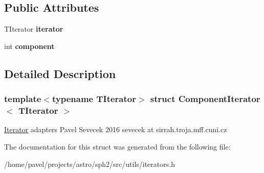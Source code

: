 \subsection*{Public Attributes}
\begin{DoxyCompactItemize}
\item 
\hypertarget{structComponentIterator_a9848900414c31afb41fd3426097cf24e}{}\label{structComponentIterator_a9848900414c31afb41fd3426097cf24e} 
T\+Iterator {\bfseries iterator}
\item 
\hypertarget{structComponentIterator_a7e530e5fea4c2dbd14287ee5efb78197}{}\label{structComponentIterator_a7e530e5fea4c2dbd14287ee5efb78197} 
int {\bfseries component}
\end{DoxyCompactItemize}


\subsection{Detailed Description}
\subsubsection*{template$<$typename T\+Iterator$>$\newline
struct Component\+Iterator$<$ T\+Iterator $>$}

\hyperlink{classIterator}{Iterator} adapters Pavel Sevecek 2016 sevecek at sirrah.\+troja.\+mff.\+cuni.\+cz 

The documentation for this struct was generated from the following file\+:\begin{DoxyCompactItemize}
\item 
/home/pavel/projects/astro/sph2/src/utils/iterators.\+h\end{DoxyCompactItemize}
